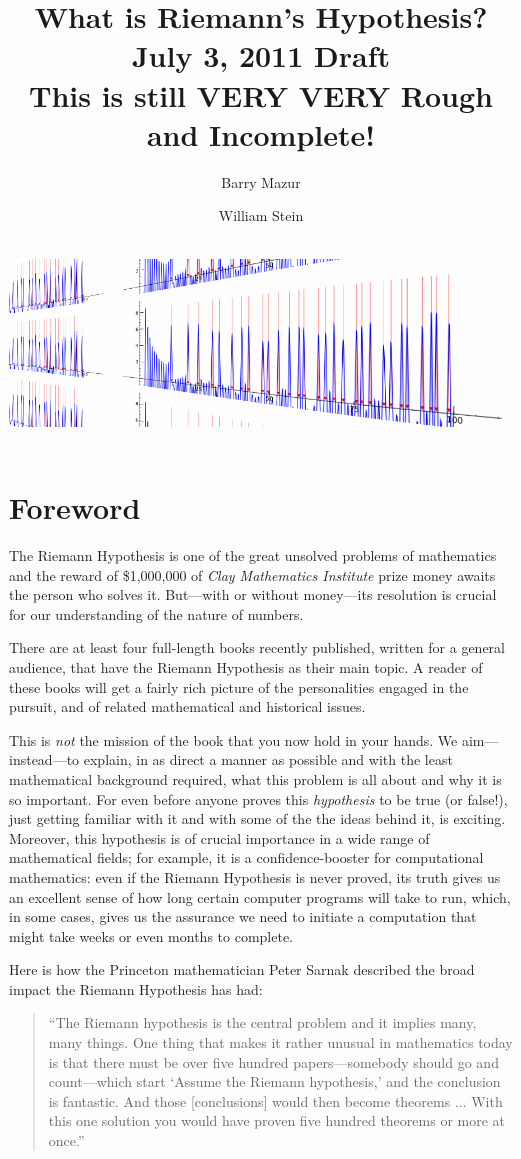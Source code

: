 \documentclass[openany]{book}
\title{\Huge What is Riemann's Hypothesis?\\
July 3, 2011 Draft\\
{\Large This is still VERY VERY Rough and Incomplete!}}
\date{}
\author{\Large Barry Mazur \and \Large William Stein \and \vspace{20ex}\\
\includegraphics[width=\textwidth]{illustrations/cover}
}
\theoremstyle{plain}
\theoremstyle{definition}
\newcommand{\RH}{Riemann Hypothesis\index{Riemann Hypothesis}}
\begin{document}
\maketitle



\setlength{\parskip}{0ex plus 0.5ex minus 0.2ex}

\tableofcontents


\setlength{\parskip}{1.3ex plus 0.2ex minus 0.2ex}

\chapter*{\label{foreword}Foreword}
The \RH{} is one of the great unsolved problems of
mathematics and the reward of \$1,000,000 of {\em Clay Mathematics
  Institute} prize money awaits the person who solves it. But---with
or without money---its resolution is crucial for our understanding of
the nature of numbers.


There are at least four full-length books recently published, written
for a general audience, that have the \RH{} as their main
topic.  A reader of these books will get a fairly rich picture of the
personalities engaged in the pursuit, and of related mathematical and
historical issues. 
     
This is {\em not} the mission of the book that you now hold in your
hands. We aim---instead---to explain, in as direct a manner as
possible and with the least mathematical background required, what
this problem is all about and why it is so important. For even before
anyone proves this {\em hypothesis} to be true (or false!), just
getting familiar with it and with some of the the ideas behind it, is
exciting.  Moreover, this hypothesis is of crucial importance in a
wide range of mathematical fields; for example, it is a
confidence-booster for computational mathematics: even if the Riemann
Hypothesis is never proved, its truth gives us an excellent sense of
how long certain computer programs will take to run, which, in some
cases, gives us the assurance we need to initiate a computation that
might take weeks or even months to complete.

Here is how the
Princeton mathematician Peter Sarnak described the broad impact the
Riemann Hypothesis has had: 
\begin{quote}
``The Riemann hypothesis is the central problem and it implies many,
many things. One thing that makes it rather unusual in mathematics
today is that there must be over five hundred papers---somebody should
go and count---which start `Assume the Riemann hypothesis,' and
the conclusion is fantastic. And those [conclusions] would then become
theorems ... With this one solution you would have proven five hundred
theorems or more at once.'' 
\end{quote}
\end{document}
